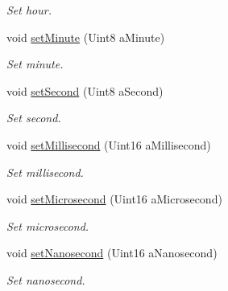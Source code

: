 \begin{DoxyCompactItemize}
\begin{DoxyCompactList}\small\item\em Set hour. \end{DoxyCompactList}\item 
void \hyperlink{classostk_1_1physics_1_1time_1_1_time_aef028b25ce2ff2d216e9fdc957c6ac4f}{set\+Minute} (Uint8 a\+Minute)
\begin{DoxyCompactList}\small\item\em Set minute. \end{DoxyCompactList}\item 
void \hyperlink{classostk_1_1physics_1_1time_1_1_time_a4f5cc2bb2a6ff653eca82e5a754fa781}{set\+Second} (Uint8 a\+Second)
\begin{DoxyCompactList}\small\item\em Set second. \end{DoxyCompactList}\item 
void \hyperlink{classostk_1_1physics_1_1time_1_1_time_a78a51113cfca7af8e14fbf519b04ad25}{set\+Millisecond} (Uint16 a\+Millisecond)
\begin{DoxyCompactList}\small\item\em Set millisecond. \end{DoxyCompactList}\item 
void \hyperlink{classostk_1_1physics_1_1time_1_1_time_a4e746282febe29d5412f7e871b49ac86}{set\+Microsecond} (Uint16 a\+Microsecond)
\begin{DoxyCompactList}\small\item\em Set microsecond. \end{DoxyCompactList}\item 
void \hyperlink{classostk_1_1physics_1_1time_1_1_time_a35df10195d96fe03990493a52cd7d61e}{set\+Nanosecond} (Uint16 a\+Nanosecond)
\begin{DoxyCompactList}\small\item\em Set nanosecond. \end{DoxyCompactList}\end{DoxyCompactItemize}
